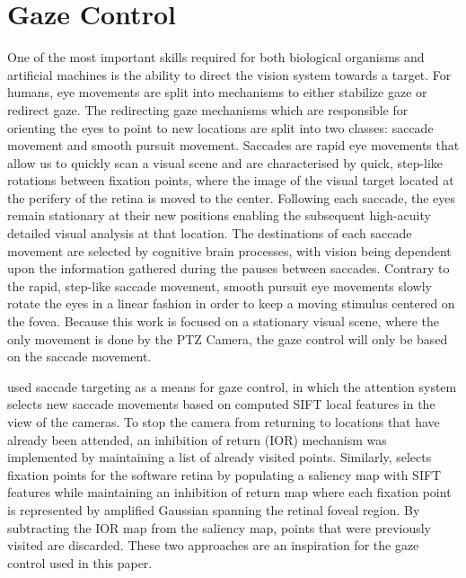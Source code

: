 \documentclass{l4proj}
\begin{document}


\section{Gaze Control}

One of the most important skills required for both biological organisms and artificial machines is the ability to direct the vision system towards a target. For humans,  eye movements are split into mechanisms to either stabilize gaze or redirect gaze. The redirecting gaze mechanisms which are responsible for orienting the eyes to point to new locations are split into two classes: saccade movement and smooth pursuit movement. Saccades are rapid eye movements that allow us to quickly scan a visual scene and are characterised by quick, step-like rotations between fixation points, where the image of the visual target located at the perifery of the retina is moved to the center. Following each saccade, the eyes remain stationary at their new positions enabling the subsequent high-acuity detailed visual analysis at that location. The destinations of each saccade movement are selected by cognitive brain processes, with vision being dependent upon the information gathered during the pauses between saccades. Contrary to the rapid, step-like saccade movement, smooth pursuit eye movements slowly rotate the eyes in a linear fashion in order to keep a moving stimulus centered on the fovea. Because this work is focused on a stationary visual scene, where the only movement is done by the PTZ Camera, the gaze control will only be based on the saccade movement. 

\citet{Fattah} used saccade targeting as a means for gaze control, in which the attention system selects new saccade movements based on computed SIFT local features in the view of the cameras. To stop the camera from returning to locations that have already been attended, an inhibition of return (IOR) mechanism was implemented by maintaining a list of already  visited points. Similarly, \citet{Ozimek} selects fixation points for the software retina by populating a saliency map with SIFT features while maintaining an inhibition of return map where each fixation point is represented by amplified Gaussian spanning the retinal foveal region. By subtracting the IOR map from the saliency map, points that were previously visited are discarded. These two approaches are an inspiration for the gaze control used in this paper. 
\end{document}
